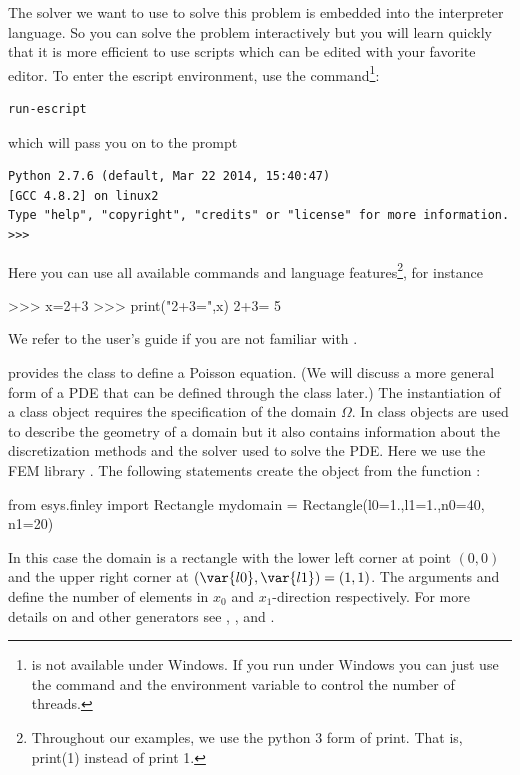 The \escript solver we want to use to solve this problem is embedded into the \PYTHON interpreter language.
So you can solve the problem interactively but you will learn quickly that it
is more efficient to use scripts which can be edited with your favorite editor.
To enter the escript environment, use the 
command\footnote{ is not available under Windows.
If you run under Windows you can just use the  command and the
 environment variable to control the number of threads.}:
\begin{verbatim}
run-escript
\end{verbatim}
which will pass you on to the \PYTHON prompt
\begin{verbatim}
Python 2.7.6 (default, Mar 22 2014, 15:40:47) 
[GCC 4.8.2] on linux2
Type "help", "copyright", "credits" or "license" for more information.
>>> 
\end{verbatim}
Here you can use all available \PYTHON commands and language features\footnote{Throughout our examples, we use the python 3 form of 
print. That is, print(1) instead of print 1.}, for instance
\begin{python}
  >>> x=2+3
  >>> print("2+3=",x)
  2+3= 5
\end{python}
We refer to the \PYTHON user's guide if you are not familiar with \PYTHON.

\escript provides the class \Poisson to define a Poisson equation.
(We will discuss a more general form of a PDE 
that can be defined through the \LinearPDE class later.)
The instantiation of a \Poisson class object requires the specification of the domain $\Omega$.
In \escript \Domain class objects are used to describe the geometry of a
domain but it also contains information about the discretization methods and
the solver used to solve the PDE.
Here we use the FEM library \finley.
The following statements create the \Domain object  from the 
\finley function :
\begin{python}
  from esys.finley import Rectangle
  mydomain = Rectangle(l0=1.,l1=1.,n0=40, n1=20)
\end{python}
In this case the domain is a rectangle with the lower left corner at point $(0,0)$
and the upper right corner at $(\var{l0},\var{l1})=(1,1)$.
The arguments  and  define the number of elements in $x_{0}$ and
$x_{1}$-direction respectively. For more details on  and
other \Domain generators see , , and
.

